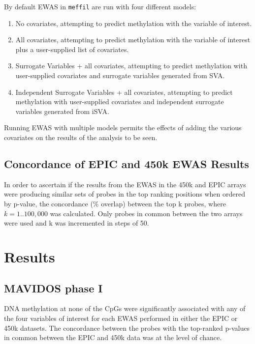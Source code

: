 \documentclass[
]{book}
\providecommand{\tightlist}{%
  \setlength{\itemsep}{0pt}\setlength{\parskip}{0pt}}
\begin{document}
By default EWAS in \texttt{meffil} are run with four different models:

\begin{enumerate}
\def\labelenumi{\arabic{enumi}.}
\tightlist
\item
  No covariates, attempting to predict methylation with the variable of interest.
\item
  All covariates, attempting to predict methylation with the variable of interest plus a user-supplied list of covariates.
\item
  Surrogate Variables + all covariates, attempting to predict methylation with user-supplied covariates and surrogate variables generated from SVA.
\item
  Independent Surrogate Variables + all covariates, attempting to predict methylation with user-supplied covariates and independent surrogate variables generated from iSVA.
\end{enumerate}

Running EWAS with multiple models permits the effects of adding the various covariates on the results of the analysis to be seen.

\hypertarget{concordance-of-epic-and-450k-ewas-results}{%
\subsection{Concordance of EPIC and 450k EWAS Results}\label{concordance-of-epic-and-450k-ewas-results}}

In order to ascertain if the results from the EWAS in the 450k and EPIC arrays were producing similar sets of probes in the top ranking positions when ordered by p-value, the concordance (\% overlap) between the top k probes, where \(k = 1 .. 100,000\) was calculated.
Only probes in common between the two arrays were used and k was incremented in steps of 50.

\hypertarget{arrayResults}{%
\section{Results}\label{arrayResults}}

\hypertarget{mavidos-phase-i}{%
\subsection{MAVIDOS phase I}\label{mavidos-phase-i}}

DNA methylation at none of the CpGs were significantly associated with any of the four variables of interest for each EWAS performed in either the EPIC or 450k datasets.
The concordance between the probes with the top-ranked p-values in common between the EPIC and 450k data was at the level of chance.
\end{document}
